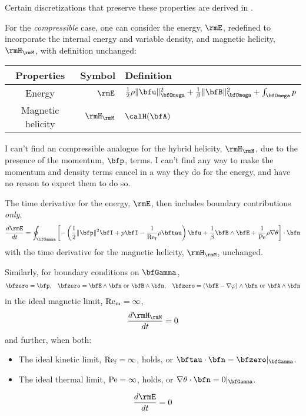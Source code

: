     Certain discretizations that preserve these properties are derived in \cite{LHF22}.

    For the \emph{compressible} case, one can consider the energy, $\rmE$, redefined to incorporate the internal energy and variable density, and magnetic helicity, $\rmH_{\rmM}$, with definition unchanged:
    \begin{center}\begin{tabular}{ c | r l }
        Properties  &  Symbol  &  Definition  \\
        \hline\hline
        Energy  &  $\rmE$  &  $\frac{1}{2}\rho\|\bfu\|_{\bfOmega}^{2} + \frac{1}{\beta}\|\bfB\|_{\bfOmega}^{2} + \int_{\bfOmega}p$  \\
        Magnetic helicity  &  $\rmH_{\rmM}$  &  $\calH(\bfA)$
    \end{tabular}\end{center}
    \begin{remark}
        I can't find an compressible analogue for the hybrid helicity, $\rmH_{\rmH}$, due to the presence of the momentum, $\bfp$, terms. I can't find any way to make the momentum and density terms cancel in a way they do for the energy, and have no reason to expect them to do so.
    \end{remark}
    The time derivative for the energy, $\rmE$, then includes boundary contributions \emph{only}, 
    \begin{equation}
        \frac{d\rmE}{dt}  =  \oint_{\bfGamma}\left[- \left(\frac{1}{2}\|\bfp\|^{2}\bfI + p\bfI - \frac{1}{\rmRef}\rho\bftau\right)\bfu + \frac{1}{\beta}\bfB\wedge\bfE + \frac{1}{\rmPe}\rho\nabla\theta\right]\cdot\bfn
    \end{equation}
    with the time derivative for the magnetic helicity, $\rmH_{\rmM}$, unchanged.
    
    Similarly, for boundary conditions on $\bfGamma$,
    \begin{align}\label{eqn:compressible canonical boundary conditions}
        \bfzero  =  \bfp,  &&
        \bfzero  =  \bfE\wedge\bfn \text{ or } \bfB\wedge\bfn,  &&
        \bfzero  =  (\bfE - \nabla\varphi)\wedge\bfn \text{ or } \bfA\wedge\bfn
    \end{align}
    in the ideal magnetic limit, $\mathrm{Re}_{\mathrm{m}}  =  \infty$, 
    \begin{equation}
        \frac{d\rmH_{\rmM}}{dt}  =  0
    \end{equation}
    and further, when both:
    \begin{itemize}
        \item  The ideal kinetic limit, $\mathrm{Re}_{\mathrm{f}}  =  \infty$, holds, or $\bftau\cdot\bfn  =  \bfzero|_{\bfGamma}$.
        \item  The ideal thermal limit, $\mathrm{Pe}  =  \infty$, holds, or $\nabla\theta\cdot\bfn  =  0|_{\bfGamma}$.
    \end{itemize}
    \begin{equation}
        \frac{d\rmE}{dt}  =  0
    \end{equation}

